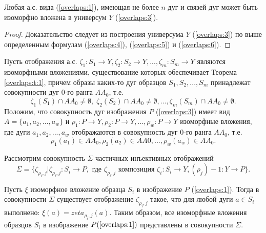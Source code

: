 \begin{theorem}
Любая а.с. вида (\ref{overlaps:1}), имеющая не более $n$ дуг и связей дуг может быть изоморфно вложена в универсум  $Y$  (\ref{overlaps:3}).
\label{overlaps:t:1}
\end{theorem}
\begin{proof}
Доказательство следует из построения универсума $Y$  (\ref{overlaps:3}) по выше определенным формулам (\ref{overlaps:4}), (\ref{overlaps:5}) и  (\ref{overlaps:6}).
\end{proof} 

Пусть отображения а.с.  $\zeta_1 : S_1\to Y , \zeta_2: S_2 \to Y , ..., \zeta_m: S_m \to Y$  являются изоморфными вложениями, существование которых обеспечивает Теорема \ref{overlaps:t:1}, причем образы каких-то дуг образцов $S_1,  S_2 , ..., S_m$ принадлежат   совокупности дуг 0-го ранга $AA_0$, т.е. 
\begin{equation}
\zeta_1 (S_1) \cap  AA_0  \neq \emptyset,\;\zeta_2 (S_2) \cap  AA_0 \neq \emptyset, ..., \zeta_m(S_m) \cap  AA_0 \neq \emptyset.
\label{overlaps:7}
\end{equation}
Положим, что совокупность дуг изображения $P$ (\ref{overlaps:3}) имеет вид
$A = \{a_1, a_2, ..., a_w\}$ и $\rho_1 : P \to Y , \rho_2: P \to Y, ..., \rho_w: P \to Y$  изоморфные вложения, где дуги  $a_1, a_2, ..., a_w$ отображаются в совокупность дуг 0-го ранга $AA_0$, т.е. 
\begin{equation}
\rho_1(a_1) \in AA_0, \rho_2(a_2) \in AA0, ..., \rho_w (a_w) \in AA_0.
\label{overlaps:8}
\end{equation}

Рассмотрим совокупность $\Sigma$ частичных инъективных отображений  
\begin{equation}
\Sigma = \{ \zeta_{\rho_i,j} | \zeta_{\rho_i,j} : S_i \to P,\text{ где } \zeta_{\rho_i,j} \text{ композиция } \zeta_i : S_i \to Y , (\rho_j)-1 : Y \to P \}.
\label{overlaps:9}
\end{equation}

\begin{theorem}
Пусть  $\xi$  изоморфное вложение образца  $S_i$  в изображение  $P$  (\ref{overlaps:1}). Тогда в совокупности  $\Sigma$  существует отображение  $\zeta_{\rho_i,j}$  такое, что для любой дуги $a \in S_i$ выполнено: $\xi(a) = zeta_{\rho_i,j}(a)$. Таким образом, все изоморфные  вложения образцов  $S_i$  в изображение  $P (\ref{overlaps:1})$ представлены в совокупности $\Sigma$.
\label{overlaps:t:2}
\end{theorem}

